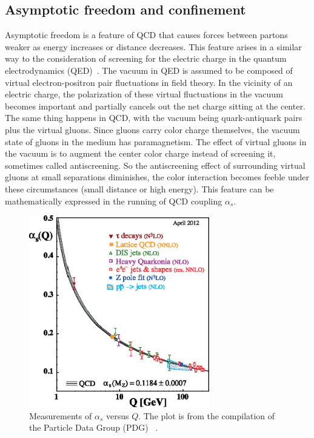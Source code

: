 \subsection{Asymptotic freedom and confinement}
Asymptotic freedom is a feature of QCD that causes forces between partons weaker
as energy increases or distance decreases. This feature arises in a similar way
to the consideration of screening for the electric charge in the quantum
electrodynamics (QED)~\cite{Feynman:1950ir, Gockeler:1997dn}. The vacuum in QED
is assumed to be composed of virtual electron-positron pair fluctuations in
field theory. In the vicinity of an electric charge, the polarization of these
virtual fluctuations in the vacuum becomes important and partially cancels out
the net charge sitting at the center. The same thing happens in QCD, with the
vacuum being quark-antiquark pairs plus the virtual gluons. Since gluons carry color
charge themselves, the vacuum state of gluons in the medium has paramagnetism.
The effect of virtual gluons in the vacuum is to augment the center color charge
instead of screening it, sometimes called antiscreening. So the antiscreening
effect of surrounding virtual gluons at small separations diminishes, the color
interaction becomes feeble under these circumstances (small distance or high
energy). This feature can be mathematically expressed in the running of QCD
coupling $\alpha_{s}$.

\begin{figure}
\centering
\includegraphics[width=0.7\textwidth]{plots/chpt2/asq.eps}
\caption[Measurements of running coupling $\alpha_{s}$ versus $Q$] {
Measurements of $\alpha_s$ versus $Q$. The plot is from the compilation of the Particle Data Group (PDG) ~\cite{Beringer:1900zz}.}
\label{fig:alpha_s}
\end{figure}

